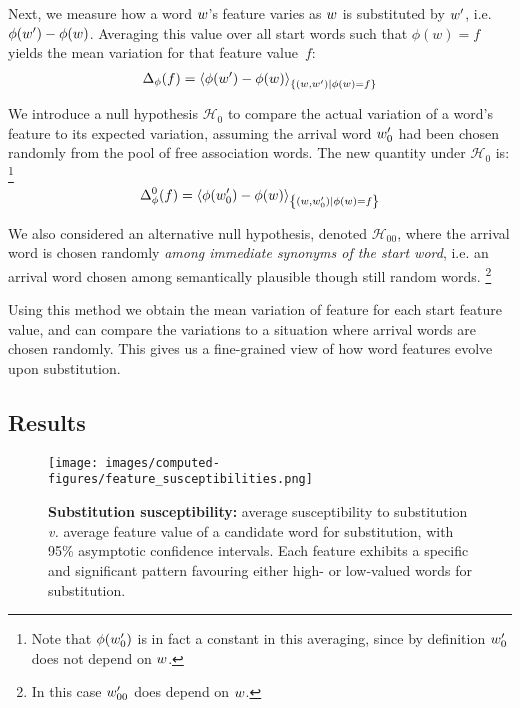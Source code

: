 Next, we measure how a word $w$'s feature varies as $w$ is substituted by $w'$, i.e. $\phi(w') - \phi(w)$.
Averaging this value over all start words such that $\phi(w) = f$ yields the mean variation for that feature value~$f$:
$$\Delta_{\phi}(f) = \left< \phi(w') - \phi(w) \right>_{\left\lbrace (w,w') | \phi(w) = f \right\rbrace}$$

We introduce a null hypothesis $\mathcal{H}_0$ to compare the actual variation of a word's feature to its expected variation, assuming the arrival word $w'_0$ had been chosen randomly from the pool of free association words.
The new quantity under $\mathcal{H}_0$ is:
\footnote{Note that $\phi(w'_0)$ is in fact a constant in this averaging, since by definition $w'_0$ does not depend on $w$.}
$$\Delta_{\phi}^0 (f) = \left< \phi({w'_0}) - \phi(w) \right>_{\left\lbrace (w,w'_0) | \phi(w) = f \right\rbrace}$$

We also considered an alternative null hypothesis, denoted $\mathcal{H}_{00}$, where the arrival word is chosen randomly \emph{among immediate synonyms of the start word}, i.e. an arrival word chosen among semantically plausible though still random words.
\footnote{In this case $w'_{00}$ does depend on $w$.} 

Using this method we obtain the mean variation of feature for each start feature value, and can compare the variations to a situation where arrival words are chosen randomly.
This gives us a fine-grained view of how word features evolve upon substitution.

\subsection{Results}


\begin{figure*}[!th]
    \centering
    \texttt{[image: images/computed-figures/feature\_susceptibilities.png]}
    \caption{\textbf{Substitution susceptibility:} average susceptibility to substitution \emph{v.} average feature value of a candidate word for substitution, with 95\% asymptotic confidence intervals.
    Each feature exhibits a specific and significant pattern favouring either high- or low-valued words for substitution.}
    \label{fig:feature-susceptibilities}
\end{figure*}

